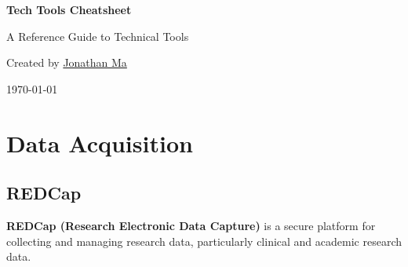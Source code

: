 \documentclass[11pt,letterpaper]{article}
\begin{document}

\begin{titlepage}
    \centering

    \vspace*{2.5cm}

    {\Huge\bfseries Tech Tools Cheatsheet\par}

    \vspace{0.5cm}

    {\Large A Reference Guide to Technical Tools\par}

    \vspace{1.5cm}

    {\large
    Created by
    \href{https://jonathanma03.github.io}{Jonathan Ma}
    \par}

    \vspace{0.5cm}

    {\large \today\par}

    \vfill

\end{titlepage}



\tableofcontents

\newpage



\section{Data Acquisition}


\subsection{REDCap}

\textbf{REDCap (Research Electronic Data Capture)} is a secure platform for
collecting and managing research data, particularly clinical and academic
research data.
\end{document}
